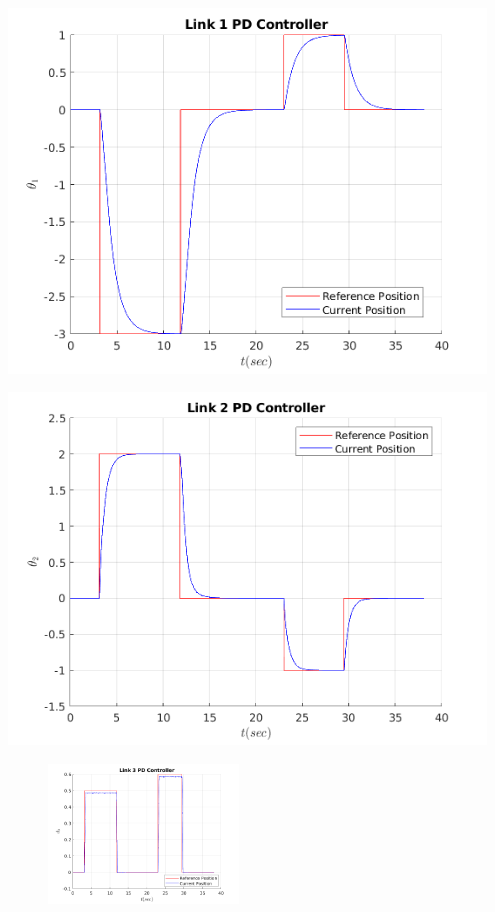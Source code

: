 \documentclass[10pt]{article}
\begin{document}
\begin{enumerate}
	\begin{minipage}[H]{0.45\textwidth}
		\centering
		\includegraphics[width=0.95\textwidth]{figures/link1-pd-plot1.png}
	\end{minipage}
	\begin{minipage}[H]{0.45\textwidth}
		\centering
		\includegraphics[width=0.95\textwidth]{figures/link2-pd-plot1.png}
	\end{minipage}

	\begin{figure}[H]
		\centering
		\includegraphics[width=0.45\textwidth]{figures/link3-pd-plot1.png}
	\end{figure}


\end{enumerate}
\end{document}
